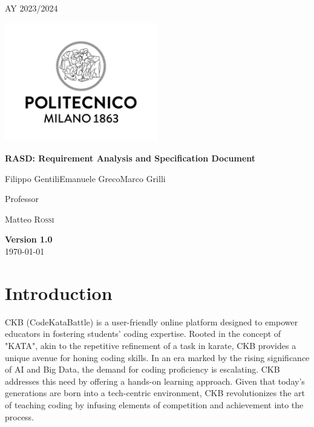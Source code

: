 \documentclass[12pt,oneside,a4paper]{article}
\begin{document}
\begin{titlepage}
    \centering
    {\scshape\large AY 2023/2024 \par}
    \vfill
    \includegraphics[width=0.5\textwidth]{Images/poli.jpg}\par\vspace{1cm}
    \vspace{1.5cm}
    {\huge\bfseries RASD\@: Requirement Analysis
        and Specification Document \par}
    \vspace{2cm}
    {\Large {Filippo Gentili\quad Emanuele Greco\quad Marco Grilli}\par}
    \vfill
    {\large Professor\par
        Matteo \textsc{Rossi}}
    \vfill
    {\large \textbf{Version 1.0}\\ \today \par}
\end{titlepage}


\renewcommand*\contentsname{Contents}

\renewcommand{\baselinestretch}{0.95}\normalsize
\tableofcontents
\renewcommand{\baselinestretch}{1}\normalsize

\pagebreak


\section{Introduction}
CKB (CodeKataBattle) is a user-friendly online platform designed to empower educators in fostering students' coding expertise. Rooted in the concept of "KATA", akin to the repetitive refinement of a task in karate, CKB provides a unique avenue for honing coding skills.
In an era marked by the rising significance of AI and Big Data, the demand for coding proficiency is escalating. CKB addresses this need by offering a hands-on learning approach.
Given that today's generations are born into a tech-centric environment, CKB revolutionizes the art of teaching coding by infusing elements of competition and achievement into the process.
\end{document}
